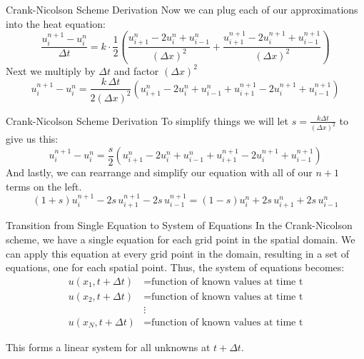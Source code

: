 \documentclass{beamer}
\begin{document}
\begin{frame}{Crank-Nicolson Scheme Derivation}
Now we can plug each of our approximations into the heat equation:
\[\frac{u_i^{n+1} - u_i^n}{\Delta t} = k \cdot \frac{1}{2} \left( 
\frac{u_{i+1}^n - 2u_i^n + u_{i-1}^n}{(\Delta x)^2} + 
\frac{u_{i+1}^{n+1} - 2u_i^{n+1} + u_{i-1}^{n+1}}{(\Delta x)^2} 
\right)
\]
Next we multiply by $\Delta t$ and factor $(\Delta x)^2$
\[u_i^{n+1} - u_i^n = \frac{k \, \Delta t}{2 (\Delta x)^2} \left( 
u_{i+1}^n - 2u_i^n + u_{i-1}^n + 
u_{i+1}^{n+1} - 2u_i^{n+1} + u_{i-1}^{n+1} 
\right)\]


\end{frame}

\begin{frame}{Crank-Nicolson Scheme Derivation}
To simplify things we will let $s = \frac{k\Delta t}{(\Delta x)^2}$ to give us this:
\[u_i^{n+1} - u_i^n = \frac{s}{2} \left( 
u_{i+1}^n - 2u_i^n + u_{i-1}^n + 
u_{i+1}^{n+1} - 2u_i^{n+1} + u_{i-1}^{n+1} 
\right)\]
And lastly, we can rearrange and simplify our equation with all of our $n+1$ terms on the left.
\[(1+s) u_i^{n+1} - 2s \, u_{i+1}^{n+1} - 2s \, u_{i-1}^{n+1} = (1-s) u_i^n + 2s \, u_{i+1}^n + 2s \, u_{i-1}^n\]

\end{frame}



\begin{frame}{Transition from Single Equation to System of Equations}
In the Crank-Nicolson scheme, we have a single equation for each grid point in the spatial domain. We can apply this equation at every grid point in the domain, resulting in a set of equations, one for each spatial point.
Thus, the system of equations becomes:
\[
\begin{aligned}
u(x_1, t+\Delta t) &= \text{function of known values at time t} \\
u(x_2, t+\Delta t) &= \text{function of known values at time t} \\
&\vdots \\
u(x_N, t+\Delta t) &= \text{function of known values at time t}
\end{aligned}
\]

This forms a linear system for all unknowns at \( t + \Delta t \).
\end{frame}
\end{document}
